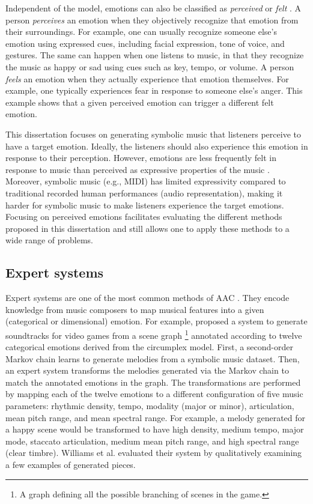 Independent of the model, emotions can also be classified as \textit{perceived} or \textit{felt} \cite{gabrielsson2001emotion}. A person \textit{perceives} an emotion when they objectively recognize that emotion from their surroundings. For example, one can usually recognize someone else's emotion using expressed cues, including facial expression, tone of voice, and gestures. The same can happen when one listens to music, in that they recognize the music as happy or sad using cues such as key, tempo, or volume. A person \textit{feels} an emotion when they actually experience that emotion themselves. For example, one typically experiences fear in response to someone else's anger. This example shows that a given perceived emotion can trigger a different felt emotion.

This dissertation focuses on generating symbolic music that listeners perceive to have a target emotion. Ideally, the listeners should also experience this emotion in response to their perception. However, emotions are less frequently felt in response to music than perceived as expressive properties of the music \cite{zentner2008emotions}. Moreover, symbolic music (e.g., MIDI) has limited expressivity compared to traditional recorded human performances (audio representation), making it harder for symbolic music to make listeners experience the target emotions. Focusing on perceived emotions facilitates evaluating the different methods proposed in this dissertation and still allows one to apply these methods to a wide range of problems.

\subsection{Expert systems}

Expert systems are one of the most common methods of AAC \cite{williams2015investigating}. They encode knowledge from music composers to map musical features into a given (categorical or dimensional) emotion. For example, \citet{williams2015dynamic} proposed a system to generate soundtracks for video games from a scene graph \footnote{A graph defining all the possible branching of scenes in the game.} annotated according to twelve categorical emotions derived from the circumplex model. First, a second-order Markov chain learns to generate melodies from a symbolic music dataset. Then, an expert system transforms the melodies generated via the Markov chain to match the annotated emotions in the graph. The transformations are performed by mapping each of the twelve emotions to a different configuration of five music parameters: rhythmic density, tempo, modality (major or minor), articulation, mean pitch range, and mean spectral range. For example, a melody generated for a happy scene would be transformed to have high density, medium tempo, major mode, staccato articulation, medium mean pitch range, and high spectral range (clear timbre). Williams et al. \cite{williams2015dynamic} evaluated their system by qualitatively examining a few examples of generated pieces.

